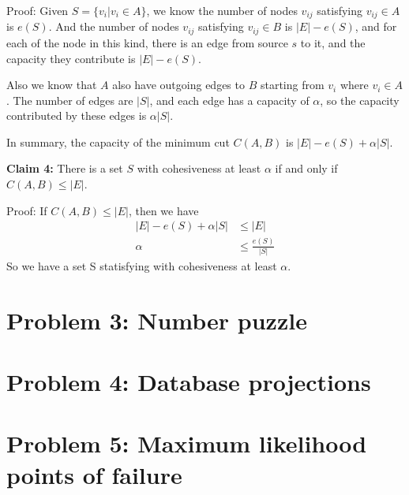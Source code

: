 \documentclass{article}
\begin{document}
Proof: Given $S = \{v_i | v_i \in A \}$, we know the number of nodes $v_{ij}$ satisfying $v_{ij} \in A$ is
$e(S)$. And the number of nodes $v_{ij}$ satisfying  $v_{ij}\in B$ is $|E| - e(S)$, and for each
of the node in this kind, there is an edge from source $s$ to it, and the capacity they contribute
is $|E| - e(S)$. 

Also we know that $A$ also have outgoing edges to $B$ starting from $v_i$ where $v_i \in A$. 
The number of edges are $|S|$, and each edge has a capacity of $\alpha$, so
the capacity contributed by these edges is $\alpha|S|$. 

In summary, the capacity of the minimum cut $C(A, B)$ is $|E| - e(S) + \alpha |S|$.

\textbf{Claim 4:} 
There is a set $S$ with cohesiveness at least $\alpha$ if and only if $C(A, B) \leq |E|$.

Proof: If $C(A, B) \leq |E|$, then we have
\begin{align}
    |E| - e(S) + \alpha |S| & \leq |E| \\
    \alpha & \leq \frac{e(S)}{|S|} 
\end{align}
So we have a set S statisfying with cohesiveness at least $\alpha$.



\section*{Problem 3: Number puzzle}

\section*{Problem 4: Database projections}

\section*{Problem 5: Maximum likelihood points of failure}
\end{document}
